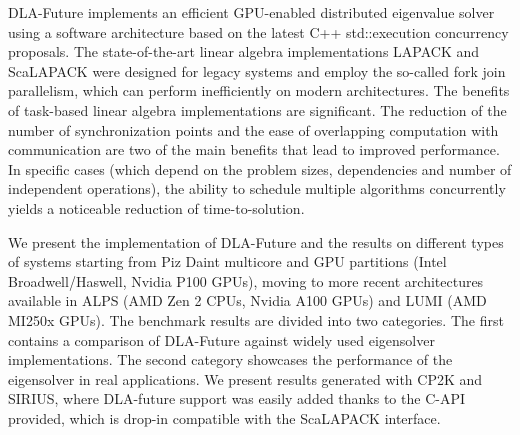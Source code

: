 DLA-Future implements an efficient GPU-enabled distributed eigenvalue solver using a software architecture based on the latest C++ std::execution concurrency proposals.
The state-of-the-art linear algebra implementations LAPACK and ScaLAPACK were designed for legacy systems and employ the so-called fork join parallelism, which can perform inefficiently on modern architectures.
The benefits of task-based linear algebra implementations are significant. The reduction of the number of synchronization points and the ease of overlapping computation with communication are two of the main benefits that lead to improved performance. In specific cases (which depend on the problem sizes, dependencies and number of independent operations), the ability to schedule multiple algorithms concurrently yields a noticeable reduction of time-to-solution.

We present the implementation of DLA-Future and the results on different types of systems starting from Piz Daint multicore and GPU partitions (Intel Broadwell/Haswell, Nvidia P100 GPUs), moving to more recent architectures available in ALPS (AMD Zen 2 CPUs, Nvidia A100 GPUs) and LUMI (AMD MI250x GPUs).
The benchmark results are divided into two categories. The first contains a comparison of DLA-Future against widely used eigensolver implementations. The second category showcases the performance of the eigensolver in real applications. We present results generated with CP2K and SIRIUS, where DLA-future support was easily added thanks to the C-API provided, which is drop-in compatible with the ScaLAPACK interface. 
